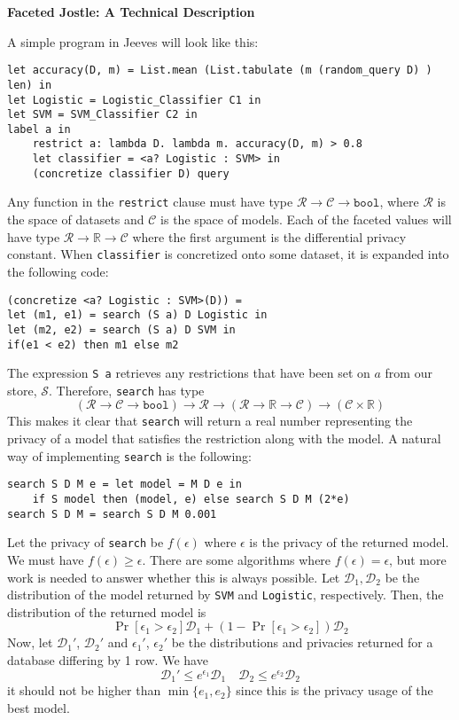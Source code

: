 \documentclass[11pt]{article}
\begin{document}
\centerline{\textbf{Faceted Jostle: A Technical Description}}
A simple program in Jeeves will look like this:
\begin{verbatim}
let accuracy(D, m) = List.mean (List.tabulate (m (random_query D) ) len) in
let Logistic = Logistic_Classifier C1 in
let SVM = SVM_Classifier C2 in
label a in
    restrict a: lambda D. lambda m. accuracy(D, m) > 0.8
    let classifier = <a? Logistic : SVM> in
    (concretize classifier D) query
\end{verbatim}
Any function in the \verb|restrict| clause must have type $\mathcal{R} \rightarrow \mathcal{C} \rightarrow \texttt{bool}$, where $\mathcal{R}$ is the space of datasets and $\mathcal{C}$ is the space of models. Each of the faceted values will have type $\mathcal{R} \rightarrow \mathbb{R} \rightarrow \mathcal{C}$ where the first argument is the differential privacy constant. When \verb|classifier| is concretized onto some dataset, it is expanded into the following code:
\begin{verbatim}
(concretize <a? Logistic : SVM>(D)) = 
let (m1, e1) = search (S a) D Logistic in
let (m2, e2) = search (S a) D SVM in
if(e1 < e2) then m1 else m2
\end{verbatim}
The expression \verb|S a| retrieves any restrictions that have been set on $a$ from our store, $\mathcal{S}$. Therefore, \verb|search| has type 
\[
(\mathcal{R} \rightarrow \mathcal{C} \rightarrow \texttt{bool}) \rightarrow \mathcal{R} \rightarrow (\mathcal{R} \rightarrow \mathbb{R} \rightarrow \mathcal{C}) \rightarrow (\mathcal{C} \times \mathbb{R})
\]
This makes it clear that \verb|search| will return a real number representing the privacy of a model that satisfies the restriction along with the model. A natural way of implementing \verb|search| is the following:
\begin{verbatim}
search S D M e = let model = M D e in
    if S model then (model, e) else search S D M (2*e)
search S D M = search S D M 0.001
\end{verbatim}
Let the privacy of \verb|search| be $f(\epsilon)$ where $\epsilon$ is the privacy of the returned model. We must have $f(\epsilon) \geq \epsilon$. There are some algorithms \cite{Ligett:2017} where $f(\epsilon) = \epsilon$, but more work is needed to answer whether this is always possible. Let $\mathcal{D}_1, \mathcal{D}_2$ be the distribution of the model returned by \verb|SVM| and \verb|Logistic|, respectively. Then, the distribution of the returned model is 
\[\Pr[\epsilon_1 > \epsilon_2]\mathcal{D}_1 + (1-\Pr[\epsilon_1 > \epsilon_2]) \mathcal{D}_2\]
Now, let $\mathcal{D}_1'$, $\mathcal{D}_2'$ and $\epsilon_1'$, $\epsilon_2'$ be the distributions and privacies returned for a database differing by 1 row. We have
\[
\mathcal{D}_1' \leq e^{\epsilon_1}\mathcal{D}_1 \quad \mathcal{D}_2 \leq e^{\epsilon_2}\mathcal{D}_2
\]
it should not be higher than $\min\{e_1, e_2\}$ since this is the privacy usage of the best model.


\end{document}
